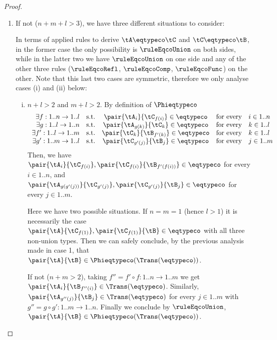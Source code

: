 \begin{proof}
\begin{itemize}
\begin{enumerate}
	\item If not (\ie $n + m + l > 3$), we have three different situations to
	consider:
    In terms of applied rules to derive $\tA \eqtypeco \tC$ and $\tC \eqtypeco
    \tB$, in the former case the only possibility is $\ruleEqcoUnion$ on both
    sides, while in the latter two we have $\ruleEqcoUnion$ on one side and any
    of the other three rules ($\ruleEqcoRefl$, $\ruleEqcoComp$,
    $\ruleEqcoFunc$) on the other. Note that this last two cases are symmetric,
    therefore we only analyse cases (i) and (ii) below:
    \begin{enumerate}[(i)]
      \item $n + l > 2$ and $m + l > 2$. By definition of $\Phieqtypeco$ $$
\begin{array}{r@{\quad\text{s.t.}\quad}c@{\quad\text{for every}\quad}l}
\exists f : 1..n \to 1..l  & \pair{\tA_i}{\tC_{f(i)}}  \in \mathbin{\eqtypeco} & i \in 1..n \\
\exists g : 1..l \to 1..n  & \pair{\tA_{g(k)}}{\tC_k}  \in \mathbin{\eqtypeco} & k \in 1..l \\
\exists f' : 1..l \to 1..m & \pair{\tC_k}{\tB_{f'(k)}} \in \mathbin{\eqtypeco} & k \in 1..l \\
\exists g' : 1..m \to 1..l & \pair{\tC_{g'(j)}}{\tB_j} \in \mathbin{\eqtypeco} & j \in 1..m
\end{array} $$
      Then, we have $\pair{\tA_i}{\tC_{f(i)}},
      \pair{\tC_{f(i)}}{\tB_{f'(f(i))}} \in \mathbin{\eqtypeco}$ for every $i
      \in 1..n$, and $\pair{\tA_{g(g'(j))}}{\tC_{g'(j)}},
      \pair{\tC_{g'(j)}}{\tB_j} \in \mathbin{\eqtypeco}$ for every $j \in
      1..m$.
      
      Here we have two possible situations. If $n = m = 1$ (hence $l > 1$) it
      is necessarily the case $\pair{\tA}{\tC_{f(1)}}, \pair{\tC_{f(1)}}{\tB}
      \in \mathbin{\eqtypeco}$ with all three non-union types. Then we can
      safely conclude, by the previous analysis made in case 1, that
      $\pair{\tA}{\tB} \in \Phieqtypeco\!\left(\Trans(\eqtypeco)\right)$.
      
      If not (\ie $n + m > 2$), taking $f'' = f' \circ f : 1..n \to 1..m$ we
      get $\pair{\tA_i}{\tB_{f''(i)}} \in \Trans\!\left(\eqtypeco\right)$.
      Similarly, $\pair{\tA_{g''(j)}}{\tB_j} \in
      \Trans\!\left(\eqtypeco\right)$ for every $j \in 1..m$ with $g'' = g
      \circ g' : 1..m \to 1..n$. Finally we conclude by $\ruleEqcoUnion$,
      $\pair{\tA}{\tB} \in \Phieqtypeco\!\left(\Trans(\eqtypeco)\right)$.


\end{enumerate}
\end{enumerate}
\end{itemize}
\end{proof}
